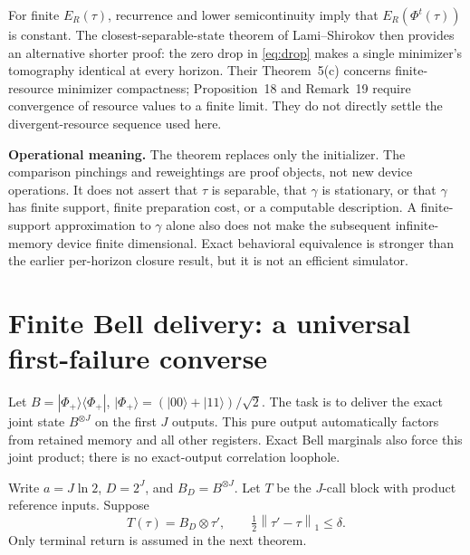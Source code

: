 \documentclass[11pt,a4paper]{article}
\numberwithin{equation}{section}
\theoremstyle{remark}
\newcommand{\ER}{E_R}
\newcommand{\normone}[1]{\left\|#1\right\|_1}
\newcommand{\ket}[1]{|#1\rangle}
\newcommand{\proj}[1]{|#1\rangle\langle#1|}
\begin{document}
For finite \(\ER(\tau)\), recurrence and lower semicontinuity imply that
\(\ER(\Phi^t(\tau))\) is constant. The closest-separable-state theorem
of Lami--Shirokov \cite{LS} then provides an alternative shorter proof:
the zero drop in \eqref{eq:drop} makes a single minimizer's tomography
identical at every horizon. Their Theorem~5(c) concerns finite-resource
minimizer compactness; Proposition~18 and Remark~19 require convergence
of resource values to a finite limit. They do not directly settle the
divergent-resource sequence used here.

\textbf{Operational meaning.} The theorem replaces only the initializer.
The comparison pinchings and reweightings are proof objects, not new device
operations. It does not assert that \(\tau\) is separable, that \(\gamma\)
is stationary, or that \(\gamma\) has finite support, finite preparation
cost, or a computable description. A finite-support approximation to
\(\gamma\) alone also does not make the subsequent infinite-memory device
finite dimensional. Exact behavioral equivalence is stronger than the
earlier per-horizon closure result, but it is not an efficient simulator.

\section{Finite Bell delivery: a universal first-failure converse}
\label{sec:bell}
Let \(B=\proj{\Phi_+}\), \(\ket{\Phi_+}=(\ket{00}+\ket{11})/\sqrt2\).
The task is to deliver the exact joint state \(B^{\otimes J}\) on the first
\(J\) outputs. This pure output automatically factors from retained
memory and all other registers. Exact Bell marginals also force this
joint product; there is no exact-output correlation loophole.

Write \(a=J\ln2\), \(D=2^J\), and \(B_D=B^{\otimes J}\). Let \(T\) be
the \(J\)-call block with product reference inputs. Suppose
\[
 T(\tau)=B_D\otimes\tau',\qquad
 \tfrac12\normone{\tau'-\tau}\leq\delta.
\]
Only terminal return is assumed in the next theorem.
\end{document}
